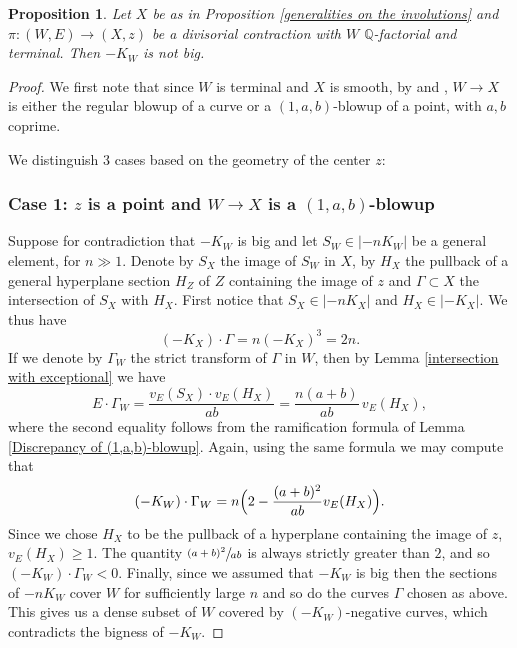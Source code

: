 \documentclass[JEP,XML,SOM,Unicode,published]{cedram}
\theoremstyle{plain}
\newtheorem{proposition}[theorem]{Proposition}
\theoremstyle{definition}
\newcommand{\QQ}{\mathbb{Q}}
\begin{document}
\begin{proposition}\label{bigness}
Let $X$ be as in Proposition \ref{generalities on the involutions} and $\pi\colon (W,E) \to (X,z)$ be a divisorial contraction with $W$ $\QQ$-factorial and terminal. Then $-K_W$ is not big.
\end{proposition}

\begin{proof}
We first note that since $W$ is terminal and $X$ is smooth, by \cite[Prop.\,1.2]{ContractionsToCurves} and \cite[Th.\,1.2]{Kawakita}, $W \to X$ is either the regular blowup of a curve or a $(1,a,b)$-blowup of a point, with $a,b$ coprime.

We distinguish 3 cases based on the geometry of the center $z$:

\subsubsection*{Case 1: $z$ is a point and $W \to X$ is a $(1,a,b)$-blowup}

Suppose for contradiction that $-K_W$ is big and let $S_W \in \lvert -nK_W \rvert$ be a general element, for $n \gg 1$. Denote by $S_X$ the image of $S_W$ in $X$, by $H_X$ the pullback of a general hyperplane section $H_Z$ of $Z$ containing the image of $z$ and $\Gamma \subset X$ the intersection of $S_X$ with $H_X$. First notice that $S_X \in \lvert -nK_X \rvert$ and $H_X \in \lvert -K_X \rvert$. We thus have\vspace*{-3pt}
\[
(-K_X)\cdot \Gamma = n(-K_X)^3 = 2n.
\]
If we denote by $\Gamma_W$ the strict transform of $\Gamma$ in $W$, then by Lemma \ref{intersection with exceptional} we have\vspace*{-3pt}
\[
E\cdot \Gamma_W = \frac{v_E(S_X)\cdot v_E(H_X)}{ab} = \frac{n(a+b)}{ab}\,v_E(H_X),
\]
where the second equality follows from the ramification formula of Lemma \ref{Discrepancy of (1,a,b)-blowup}. Again, using the same formula we may compute that\vspace*{-3pt}
\[
(-K_W)\cdot \Gamma_W = n\Bigl(2 - \frac{(a+b)^2}{ab}v_E(H_X) \Bigr).
\]
Since we chose $H_X$ to be the pullback of a hyperplane containing the image of $z$, $v_E(H_X) \geq 1$.
The quantity $\sfrac{(a+b)^2}{ab}$ is always strictly greater than $2$, and so $(-K_W)\cdot \Gamma_W<0$.
Finally, since we assumed that $-K_W$ is big then the sections of $-nK_W$ cover $W$ for sufficiently large $n$ and so do the curves $\Gamma$ chosen as above. This gives us a dense subset of $W$ covered by $(-K_W)$-negative curves, which contradicts the bigness of $-K_W$.


\end{proof}
\end{document}
